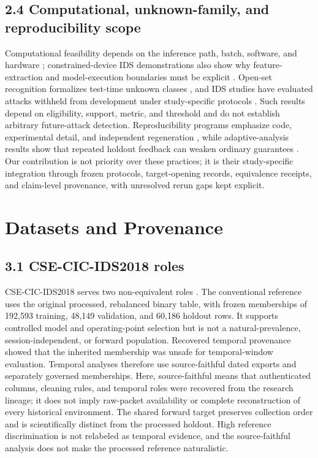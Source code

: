 \documentclass[preprint,12pt]{elsarticle}
\begin{document}
\subsection{2.4 Computational, unknown-family, and reproducibility scope}
Computational feasibility depends on the inference path, batch, software, and hardware \cite{mattson2020mlperf}; constrained-device IDS demonstrations also show why feature-extraction and model-execution boundaries must be explicit \cite{mirsky2018kitsune}. Open-set recognition formalizes test-time unknown classes \cite{scheirer2013openset}, and IDS studies have evaluated attacks withheld from development under study-specific protocols \cite{zoppi2023unknown, shin2023openset}. Such results depend on eligibility, support, metric, and threshold and do not establish arbitrary future-attack detection.
Reproducibility programs emphasize code, experimental detail, and independent regeneration \cite{pineau2021reproducibility}, while adaptive-analysis results show that repeated holdout feedback can weaken ordinary guarantees \cite{dwork2015holdout}. Our contribution is not priority over these practices; it is their study-specific integration through frozen protocols, target-opening records, equivalence receipts, and claim-level provenance, with unresolved rerun gaps kept explicit.

\section{Datasets and Provenance}

\subsection{3.1 CSE-CIC-IDS2018 roles}
CSE-CIC-IDS2018 serves two non-equivalent roles \cite{cse_cic_ids2018_official, sharafaldin2018toward}. The conventional reference uses the original processed, rebalanced binary table, with frozen memberships of 192,593 training, 48,149 validation, and 60,186 holdout rows. It supports controlled model and operating-point selection but is not a natural-prevalence, session-independent, or forward population.
Recovered temporal provenance showed that the inherited membership was unsafe for temporal-window evaluation. Temporal analyses therefore use source-faithful dated exports and separately governed memberships. Here, source-faithful means that authenticated columns, cleaning rules, and temporal roles were recovered from the research lineage; it does not imply raw-packet availability or complete reconstruction of every historical environment. The shared forward target preserves collection order and is scientifically distinct from the processed holdout. High reference discrimination is not relabeled as temporal evidence, and the source-faithful analysis does not make the processed reference naturalistic.
\end{document}
